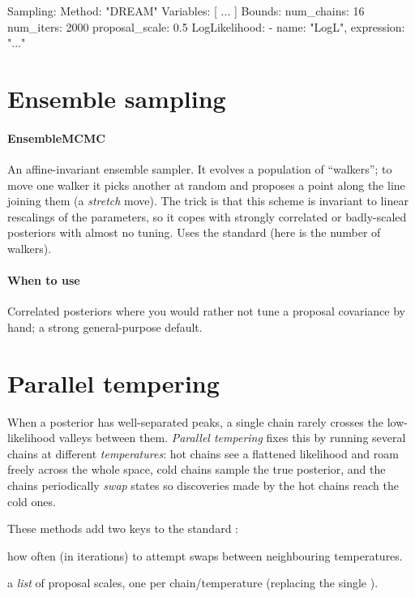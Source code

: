 \begin{yamlwin}
Sampling:
  Method: "DREAM"
  Variables: [ ... ]
  Bounds:
    num_chains: 16
    num_iters: 2000
    proposal_scale: 0.5
  LogLikelihood:
    - {name: "LogL", expression: "..."}
\end{yamlwin}

\section{Ensemble sampling}
\label{sec:mcmc2-ensemble}

\paragraph{EnsembleMCMC} An affine-invariant ensemble sampler. It evolves a population of
``walkers''; to move one walker it picks another at random and proposes a point along the line
joining them (a \emph{stretch} move). The trick is that this scheme is invariant to linear
rescalings of the parameters, so it copes with strongly correlated or badly-scaled posteriors with
almost no tuning. Uses the standard  (here  is the number of
walkers).

\paragraph{When to use} Correlated posteriors where you would rather not tune a proposal covariance
by hand; a strong general-purpose default.

\section{Parallel tempering}
\label{sec:mcmc2-pt}

When a posterior has well-separated peaks, a single chain rarely crosses the low-likelihood valleys
between them. \emph{Parallel tempering} fixes this by running several chains at different
\emph{temperatures}: hot chains see a flattened likelihood and roam freely across the whole space,
cold chains sample the true posterior, and the chains periodically \emph{swap} states so discoveries
made by the hot chains reach the cold ones.

These methods add two keys to the standard :

\begin{description}[style=nextline, leftmargin=1.2em]
  \item[\yamlkey{exchange\_interval}] how often (in iterations) to attempt swaps between
        neighbouring temperatures.
  \item[\yamlkey{proposal\_scales}] a \emph{list} of proposal scales, one per chain/temperature
        (replacing the single ).
\end{description}

